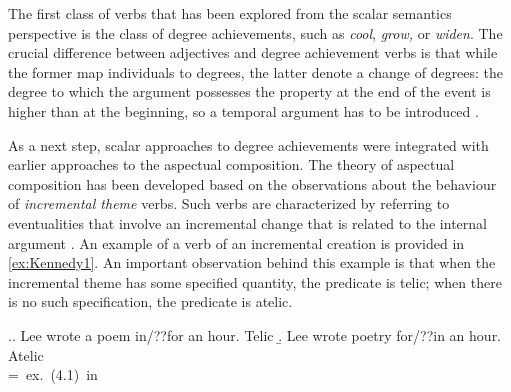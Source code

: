 The first class of verbs that has been explored from the scalar semantics perspective is the class of degree achievements, such as \textit{cool}, \textit{grow,} or \textit{widen}. The crucial difference between adjectives and degree achievement verbs is that while the former map individuals to degrees, the latter denote a change of degrees: the degree to which the argument possesses the property at the end of the event is higher than at the beginning, so a temporal argument has to be introduced \citep{Hay:99, KennedyLevin:02}.


As a next step, scalar approaches to degree achievements were integrated with earlier approaches to the aspectual composition. The theory of aspectual composition has been developed based on the observations about the behaviour of \textit{incremental theme} verbs. Such verbs are characterized by referring to eventualities that involve an incremental change that is related to the internal argument \citep[see][]{Garey:57, Wierzbicka:67, Verkuyl:72, Krifka:86, Krifka:92, Filip:92, Filip:99}. An example of a verb of an incremental creation is provided in \ref{ex:Kennedy1}. An important observation behind this example is that when the incremental theme has some specified quantity, the predicate is telic; when there is no such specification, the predicate is atelic.


\ex.\label{ex:Kennedy1}\a. Lee wrote a poem in/??for an hour. \hfill Telic
\b. Lee wrote poetry for/??in an hour. \hfill Atelic\\
\hbox{}\hfill\hbox{= ex.~(4.1) in \citealt[103]{Kennedy:12}}


%

